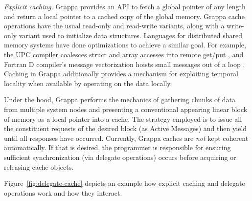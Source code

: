 \vspace{1ex}
\textit{Explicit caching.} Grappa provides an API to fetch a global pointer of
any length and return a local pointer to a cached copy of the global memory.
Grappa cache operations have the usual read-only and read-write variants,
along with a write-only variant used to initialize data structures. Languages
for distributed shared memory systems have done optimizations to achieve a
similar goal. For example, the UPC compiler coalesces struct and array
accesses into remote get/put \cite{Chen:2005}, and Fortran D compiler's
message vectorization hoists small messages out of a loop
\cite{FortranD:1992}. Caching in Grappa additionally provides a mechanism for
exploiting temporal locality when available by operating on the data locally.

Under the hood, Grappa performs the mechanics of gathering chunks of data from
multiple system nodes and presenting a conventional appearing linear block of
memory as a local pointer into a cache. The strategy employed is to issue all
the constituent requests of the desired block (as Active Messages) and then
yield until all responses have occurred. Currently, Grappa caches are
\emph{not\/} kept coherent automatically. If that is desired, the programmer is
responsible for ensuring sufficient synchronization (via delegate operations)
occurs before acquiring or releasing cache objects.

Figure~\ref{fig:delegate-cache} depicts an example how explicit caching and
delegate operations work and how they interact.

